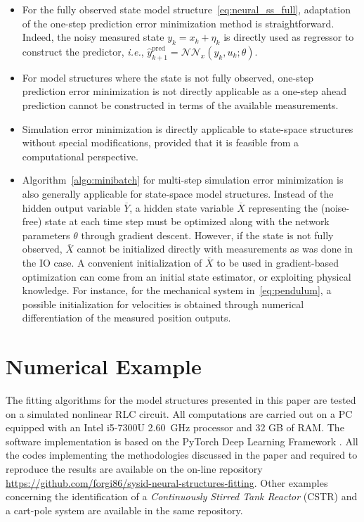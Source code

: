 \documentclass{article}
\newcommand{\NN}{\mathcal{N\!N}} %
\newcommand{\hidden}[1]{\overline{#1}}
\begin{document}
\begin{itemize}	
\item For the fully observed state model structure~\eqref{eq:neural_ss_full}, adaptation of the one-step prediction error minimization method is straightforward. Indeed, the noisy measured state $y_k=x_k+\eta_k$ is directly used as regressor to construct the predictor, \emph{i.e.}, $\hat y_{k+1}^{\mathrm{pred}} = \NN_x(y_{k},u_k; \theta)$.
\item For model structures where the state is not fully observed, one-step prediction error minimization is not directly applicable as 
a one-step ahead prediction cannot be constructed in terms of the available measurements.
\item Simulation error minimization is directly applicable to state-space structures without special modifications, provided that it is feasible from a computational perspective.	
\item Algorithm~\ref{algo:minibatch} for multi-step simulation error minimization is also generally applicable for  state-space model structures.  Instead of the hidden output variable $\hidden{Y}$, a hidden state variable $\hidden{X}$ representing the (noise-free) state at each time step must be optimized along with the network parameters $\theta$ through gradient descent. However, if the state is not fully observed, $\hidden{X}$ cannot be initialized directly with measurements as was done in the IO case.
A convenient initialization of $\hidden{X}$ to be used in  gradient-based optimization can come from an initial state estimator, or exploiting physical knowledge. For instance, for the mechanical system in~\eqref{eq:pendulum}, a possible initialization for velocities is obtained through numerical differentiation  of the measured position outputs.
\end{itemize}	

\section{Numerical Example}
\label{sec:example}
The fitting algorithms for the model structures presented in this paper are tested  on a simulated nonlinear RLC circuit.  
 All computations are carried out on a PC equipped with an Intel i5-7300U 2.60~GHz processor and 32 GB of RAM.  
 The software implementation is based on the PyTorch Deep Learning Framework \citep{paszke:2017automatic}.  All the codes implementing the methodologies discussed in the paper and  required to reproduce the results are available on the on-line repository \url{https://github.com/forgi86/sysid-neural-structures-fitting}. Other examples concerning the identification  of a \emph{Continuously Stirred Tank Reactor} (CSTR) and a cart-pole system are available in the same repository.
\end{document}
